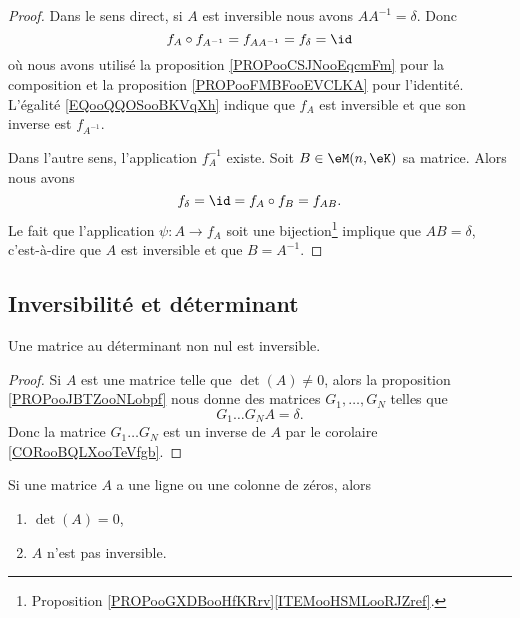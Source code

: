 \begin{proof}
    Dans le sens direct, si \( A\) est inversible nous avons \( AA^{-1}=\delta\). Donc
    \begin{equation}        \label{EQooQQOSooBKVqXh}
        f_A\circ f_{A^{-1}}=f_{AA^{-1}}=f_{\delta}=\id
    \end{equation}
    où nous avons utilisé la proposition \ref{PROPooCSJNooEqcmFm} pour la composition et la proposition \ref{PROPooFMBFooEVCLKA} pour l'identité. L'égalité \eqref{EQooQQOSooBKVqXh} indique que \( f_A\) est inversible et que son inverse est \( f_{A^{-1}}\).

    Dans l'autre sens, l'application \( f_A^{-1}\) existe. Soit \( B\in \eM(n,\eK)\) sa matrice. Alors nous avons
    \begin{equation}
        f_{\delta}=\id=f_A\circ f_B=f_{AB}.
    \end{equation}
    Le fait que l'application \(\psi\colon A\to f_A\) soit une bijection\footnote{Proposition \ref{PROPooGXDBooHfKRrv}\ref{ITEMooHSMLooRJZref}.} implique que \( AB=\delta\), c'est-à-dire que \( A\) est inversible et que \( B=A^{-1}\).
\end{proof}

\subsection{Inversibilité et déterminant}

\begin{proposition}     \label{PROPooAVIXooMtVCet}
    Une matrice au déterminant non nul est inversible.
\end{proposition}

\begin{proof}
    Si \( A\) est une matrice telle que \( \det(A)\neq 0\), alors la proposition \ref{PROPooJBTZooNLobpf} nous donne des matrices \( G_1,\ldots, G_N\) telles que
    \begin{equation}
        G_1\ldots G_NA=\delta.
    \end{equation}
    Donc la matrice \( G_1\ldots G_N\) est un inverse de \( A\) par le corolaire \ref{CORooBQLXooTeVfgb}.
\end{proof}

\begin{proposition}     \label{PROPooEOKBooKUROFg}
    Si une matrice \( A\) a une ligne ou une colonne de zéros, alors
    \begin{enumerate}
        \item
            \( \det(A)=0\),
        \item
            \( A\) n'est pas inversible.
    \end{enumerate}
\end{proposition}

